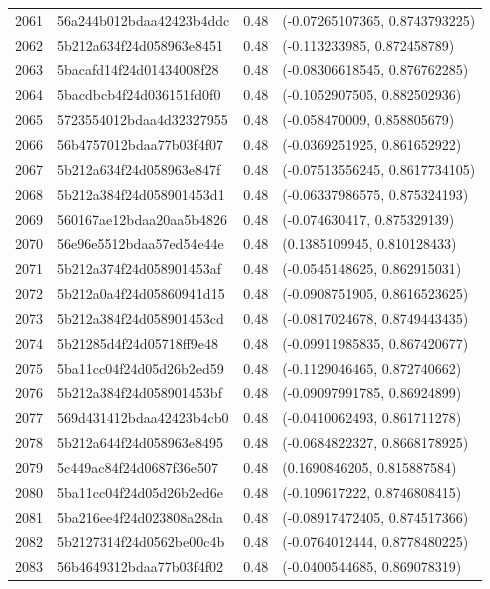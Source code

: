 \begin{table}[ht]
\begin{tabular}{rlrl}
  2061 & 56a244b012bdaa42423b4ddc & 0.48 & (-0.07265107365, 0.8743793225) \\ 
  2062 & 5b212a634f24d058963e8451 & 0.48 & (-0.113233985, 0.872458789) \\ 
  2063 & 5bacafd14f24d01434008f28 & 0.48 & (-0.08306618545, 0.876762285) \\ 
  2064 & 5bacdbcb4f24d036151fd0f0 & 0.48 & (-0.1052907505, 0.882502936) \\ 
  2065 & 5723554012bdaa4d32327955 & 0.48 & (-0.058470009, 0.858805679) \\ 
  2066 & 56b4757012bdaa77b03f4f07 & 0.48 & (-0.0369251925, 0.861652922) \\ 
  2067 & 5b212a634f24d058963e847f & 0.48 & (-0.07513556245, 0.8617734105) \\ 
  2068 & 5b212a384f24d058901453d1 & 0.48 & (-0.06337986575, 0.875324193) \\ 
  2069 & 560167ae12bdaa20aa5b4826 & 0.48 & (-0.074630417, 0.875329139) \\ 
  2070 & 56e96e5512bdaa57ed54e44e & 0.48 & (0.1385109945, 0.810128433) \\ 
  2071 & 5b212a374f24d058901453af & 0.48 & (-0.0545148625, 0.862915031) \\ 
  2072 & 5b212a0a4f24d05860941d15 & 0.48 & (-0.0908751905, 0.8616523625) \\ 
  2073 & 5b212a384f24d058901453cd & 0.48 & (-0.0817024678, 0.8749443435) \\ 
  2074 & 5b21285d4f24d05718ff9e48 & 0.48 & (-0.09911985835, 0.867420677) \\ 
  2075 & 5ba11cc04f24d05d26b2ed59 & 0.48 & (-0.1129046465, 0.872740662) \\ 
  2076 & 5b212a384f24d058901453bf & 0.48 & (-0.09097991785, 0.86924899) \\ 
  2077 & 569d431412bdaa42423b4cb0 & 0.48 & (-0.0410062493, 0.861711278) \\ 
  2078 & 5b212a644f24d058963e8495 & 0.48 & (-0.0684822327, 0.8668178925) \\ 
  2079 & 5c449ac84f24d0687f36e507 & 0.48 & (0.1690846205, 0.815887584) \\ 
  2080 & 5ba11cc04f24d05d26b2ed6e & 0.48 & (-0.109617222, 0.8746808415) \\ 
  2081 & 5ba216ee4f24d023808a28da & 0.48 & (-0.08917472405, 0.874517366) \\ 
  2082 & 5b2127314f24d0562be00c4b & 0.48 & (-0.0764012444, 0.8778480225) \\ 
  2083 & 56b4649312bdaa77b03f4f02 & 0.48 & (-0.0400544685, 0.869078319) \\ 

\end{tabular}
\end{table}
